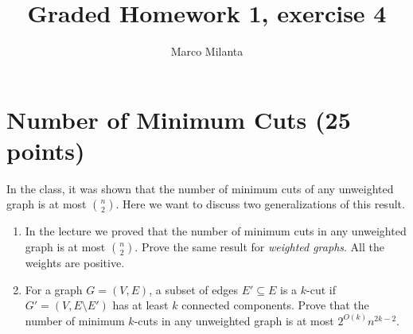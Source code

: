 \documentclass[11pt]{article}
\begin{document}
\author{Marco Milanta}
\title{Graded Homework 1, exercise 4}
\maketitle


\section*{Number of Minimum Cuts (25 points)}
In the class, it was shown that the number of minimum cuts of any unweighted graph is at most $\binom{n}{2}$. Here we want to discuss two generalizations of this result.

\begin{enumerate}
    \item In the lecture we proved that the number of minimum cuts in any unweighted graph is at most $\binom{n}{2}$. Prove the same result for \emph{weighted graphs}. All the weights are positive.
    
    \item For a graph $G = (V, E)$, a subset of edges $E' \subseteq E$ is a $k$-cut if $G' = (V, E \setminus E')$ has at least $k$ connected components. Prove that the number of minimum $k$-cuts in any unweighted graph is at most $2^{O(k)}n^{2k-2}$.
\end{enumerate}
\end{document}
